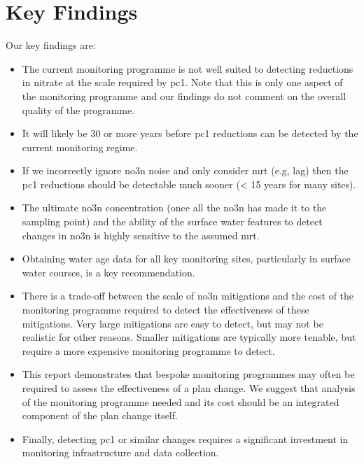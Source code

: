 \section*{Key Findings} \label{keyf} %

\begin{breakawaybox}[label={box:keyfind}, title=Key Findings]{}
    Our key findings are:
    \begin{itemize}
        \item The current monitoring programme is not well suited to detecting reductions in nitrate at the scale required by \gls{pc1}. Note that this is only one aspect of the monitoring programme and our findings do not comment on the overall quality of the programme.
        \item It will likely be 30 or more years before \gls{pc1} reductions can be detected by the current monitoring regime.
        \item If we incorrectly ignore \gls{no3n} noise and only consider \gls{mrt} (e.g, lag) then the \gls{pc1} reductions should be detectable much sooner (< 15 years for many sites).
        \item The ultimate \gls{no3n} concentration (once all the \gls{no3n} has made it to the sampling point) and the ability of the surface water features to detect changes in \gls{no3n} is highly sensitive to the assumed \gls{mrt}.
        \item Obtaining water age data for all key monitoring sites, particularly in surface water courses, is a key recommendation.
        \item There is a trade-off between the scale of \gls{no3n} mitigations and the cost of the monitoring programme required to detect the effectiveness of these mitigations. Very large mitigations are easy to detect, but may not be realistic for other reasons. Smaller mitigations are typically more tenable, but require a more expensive monitoring programme to detect.
        \item This report demonstrates that bespoke monitoring programmes may often be required to assess the effectiveness of a plan change. We suggest that analysis of the monitoring programme needed and its cost should be an integrated component of the plan change itself.
        \item Finally, detecting \gls{pc1} or similar changes requires a significant investment in monitoring infrastructure and data collection.
    \end{itemize}

\end{breakawaybox}

